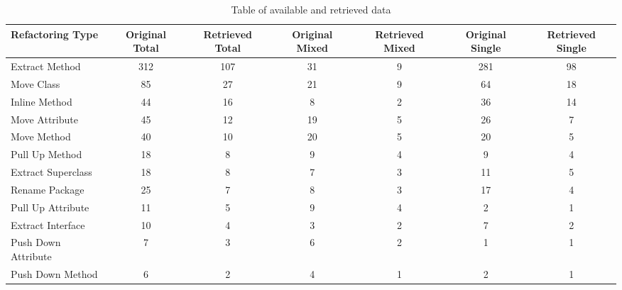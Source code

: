 \begin{table*}
    \begin{tabular}{lcccccc}
    \toprule
    Refactoring Type & Original Total & Retrieved Total & Original Mixed & Retrieved Mixed & Original Single & Retrieved Single\\
    \midrule
    Extract Method & 312 & 107 & 31 & 9 & 281 & 98\\
    Move Class & 85 & 27 & 21 & 9 & 64 & 18\\
    Inline Method & 44 & 16 & 8 & 2 & 36 & 14\\
    Move Attribute & 45 & 12 & 19 & 5 & 26 & 7\\
    Move Method & 40 & 10 & 20 & 5 & 20 & 5\\
    Pull Up Method & 18 & 8 & 9 & 4 & 9 & 4\\
    Extract Superclass & 18 & 8 & 7 & 3 & 11 & 5\\
    Rename Package & 25 & 7 & 8 & 3 & 17 & 4\\
    Pull Up Attribute & 11 & 5 & 9 & 4 & 2 & 1\\
    Extract Interface & 10 & 4 & 3 & 2 & 7 & 2\\
    Push Down Attribute & 7 & 3 & 6 & 2 & 1 & 1\\
    Push Down Method & 6 & 2 & 4 & 1 & 2 & 1\\
    \bottomrule
    \end{tabular}
    \caption{Table of available and retrieved data}
    \label{tab:data}
\end{table*}
